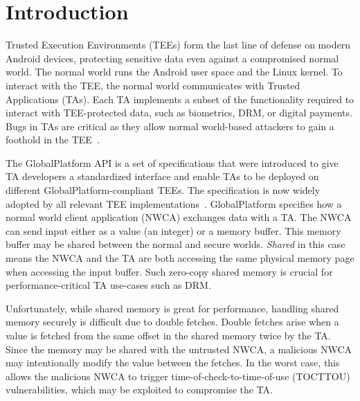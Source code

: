 \documentclass[letterpaper,twocolumn,10pt]{article}
\begin{document}
\section{Introduction}\label{sec:introduction}

Trusted Execution Environments (TEEs) form the last line of defense on modern Android devices, protecting 
sensitive data even against a compromised normal world. The normal world 
runs the Android user space and the Linux kernel.  
To interact with the TEE, the normal world communicates with 
Trusted Applications (TAs). Each TA implements a subset of the functionality 
required to interact with TEE-protected data, such as biometrics, DRM, or digital payments. Bugs in TAs 
are critical as they allow normal world-based attackers to gain a foothold in the TEE~\cite{beniaini2017trustissues,berard2018kinibi,busch2020finding,rollback,globalconfusion,Komaromy2021UnboxYourPhone,Li2024DiveIntoAndroidTA,AdamskiGuilbonPeterlin2019SamsungTrustZone,Makkaveev2019TrustZoneFuzzing,AdamTC}.

The GlobalPlatform API is a set of specifications that were introduced to 
give TA developers a standardized interface and enable TAs to be deployed on 
different GlobalPlatform-compliant TEEs. The specification is now widely adopted by all  
relevant TEE implementations~\cite{globalconfusion}. GlobalPlatform specifies how a normal 
world client application (NWCA) exchanges data with a TA. The NWCA can send input either as a value (an 
integer) or a memory buffer. This memory buffer may be shared between the 
normal and secure worlds. \textit{Shared} in this case means the NWCA and the TA are both 
accessing the same physical memory page when accessing the input buffer. Such zero-copy 
shared memory is crucial for performance-critical TA use-cases such as DRM.

Unfortunately, while shared memory is great for performance, handling shared 
memory securely is difficult due to double fetches. Double fetches arise when 
a value is fetched from the same offset in the shared memory twice by the TA. 
Since the memory may be shared with the untrusted NWCA, a malicious NWCA may intentionally 
modify the value between the fetches. 
In the worst case, this allows the malicious NWCA to trigger time-of-check-to-time-of-use (TOCTTOU) 
vulnerabilities, which may be exploited to compromise the TA.
\end{document}
